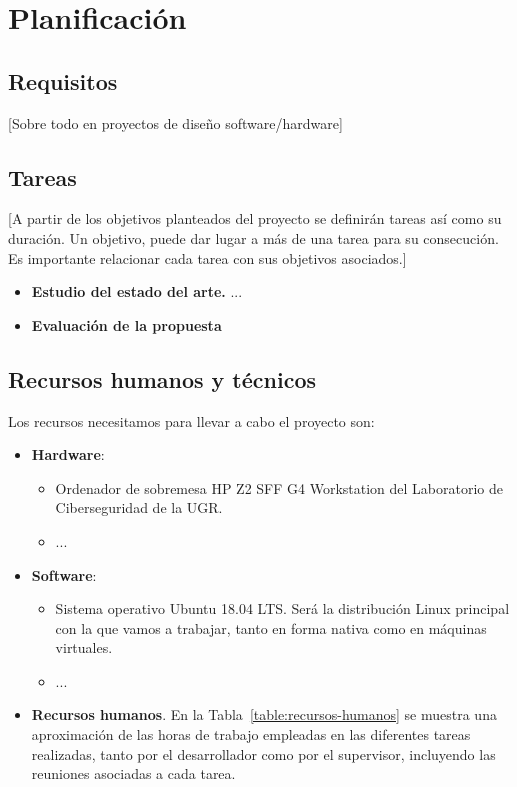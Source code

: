 \chapter{Planificación}\label{cap:planif}

\section{Requisitos}
[Sobre todo en proyectos de diseño software/hardware]

\section{Tareas}
[A partir de los objetivos planteados del proyecto se definirán tareas así como su duración. Un objetivo, puede dar lugar a más de una tarea para su consecución. Es importante relacionar cada tarea con sus objetivos asociados.]

\begin{itemize}
    \item \textbf{Estudio del estado del arte.} ...
    \item \textbf{Evaluación de la propuesta} 
\end{itemize}

\section{Recursos humanos y técnicos}

Los recursos necesitamos para llevar a cabo el proyecto son:

\begin{itemize}
    \item \textbf{Hardware}:
    
    \begin{itemize}
        \item Ordenador de sobremesa HP Z2 SFF G4 Workstation del Laboratorio de Ciberseguridad de la UGR.
        
        \item ...
    \end{itemize}
        
    \item \textbf{Software}:
        
    \begin{itemize}
        \item Sistema operativo Ubuntu 18.04 LTS. Será la distribución Linux principal con la que vamos a trabajar, tanto en forma nativa como en máquinas virtuales.
        
        \item ...
        
    \end{itemize}
    
    \item \textbf{Recursos humanos}. En la Tabla~\ref{table:recursos-humanos} se muestra una aproximación de las horas de trabajo empleadas en las diferentes tareas realizadas, tanto por el desarrollador como por el supervisor, incluyendo las reuniones asociadas a cada tarea.
\end{itemize}

